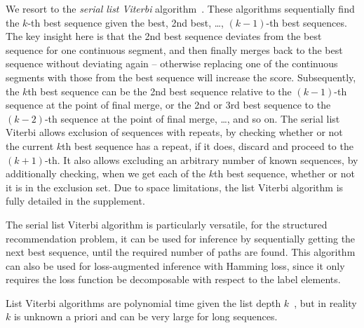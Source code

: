 We resort to the \emph{serial list Viterbi} algorithm~\cite{seshadri1994list,nilsson2001sequentially}.
These algorithms sequentially find the $k$-th best sequence given the best, 2nd best, \dots, $(k \!-\! 1)$-th best sequences.
The key insight here is that the 2nd best sequence deviates from the best sequence
for one continuous segment, and then finally merges back to the best sequence without deviating again
-- otherwise replacing one of the continuous segments with those from the best sequence will increase the score.
Subsequently, the $k$th best sequence can be the 2nd best sequence relative to the $(k \!-\! 1)$-th sequence
at the point of final merge, or the 2nd or 3rd best sequence to the $(k \!-\! 2)$-th sequence at the point of final merge, \ldots, and so on.
The serial list Viterbi allows exclusion of sequences with repeats, by checking whether or not the current $k$th best sequence has a repeat, if it does, discard and proceed to the $(k \!+\! 1)$-th. It also allows excluding an arbitrary number of known sequences, by additionally checking, when we get each of the $k$th best sequence, whether or not it is in the exclusion set.
Due to space limitations, the list Viterbi algorithm is fully detailed in the supplement.

The serial list Viterbi algorithm is particularly versatile, 
for the structured recommendation problem, %
it can be used for inference by sequentially getting the next best sequence, until the required number of %
paths are found.
This algorithm can also be used for loss-augmented inference with Hamming loss,
since it only requires the loss function be decomposable with respect to the label elements.


%
List Viterbi algorithms are polynomial time given the list depth $k$~\cite{nilsson2001sequentially},
but in reality $k$ is unknown a priori and can be very large for long sequences.
